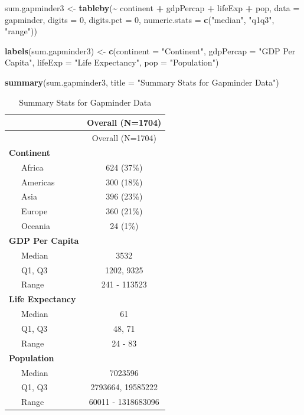 \documentclass[
]{book}
\makeatletter
\newenvironment{Shaded}{\begin{snugshade}}{\end{snugshade}}
\newcommand{\AttributeTok}[1]{\textcolor[rgb]{0.27,0.27,0.27}{#1}}
\newcommand{\DecValTok}[1]{\textcolor[rgb]{0.06,0.06,0.06}{#1}}
\newcommand{\FunctionTok}[1]{\textcolor[rgb]{0.27,0.27,0.27}{\textbf{#1}}}
\newcommand{\NormalTok}[1]{#1}
\newcommand{\OtherTok}[1]{\textcolor[rgb]{0.37,0.37,0.37}{#1}}
\newcommand{\SpecialCharTok}[1]{\textcolor[rgb]{0.43,0.43,0.43}{\textbf{#1}}}
\newcommand{\StringTok}[1]{\textcolor[rgb]{0.5,0.5,0.5}{#1}}
\newenvironment{kframe}{%
\medskip{}
\setlength{\fboxsep}{.8em}
 \def\at@end@of@kframe{}%
 \ifinner\ifhmode%
  \def\at@end@of@kframe{\end{minipage}}%
  \begin{minipage}{\columnwidth}%
 \fi\fi%
 \def\FrameCommand##1{\hskip\@totalleftmargin \hskip-\fboxsep
 \colorbox{shadecolor}{##1}\hskip-\fboxsep
     \hskip-\linewidth \hskip-\@totalleftmargin \hskip\columnwidth}%
 \MakeFramed {\advance\hsize-\width
   \@totalleftmargin\z@ \linewidth\hsize
   \@setminipage}}%
 {\par\unskip\endMakeFramed%
 \at@end@of@kframe}
\renewenvironment{Shaded}{\begin{kframe}}{\end{kframe}}
\makeatother
\begin{document}
\begin{Shaded}
\begin{Highlighting}[]
\NormalTok{sum.gapminder3 }\OtherTok{\textless{}{-}} \FunctionTok{tableby}\NormalTok{(}\SpecialCharTok{\textasciitilde{}}\NormalTok{ continent }\SpecialCharTok{+}\NormalTok{ gdpPercap }\SpecialCharTok{+}\NormalTok{ lifeExp }\SpecialCharTok{+}\NormalTok{ pop, }\AttributeTok{data =}\NormalTok{ gapminder, }\AttributeTok{digits =} \DecValTok{0}\NormalTok{, }\AttributeTok{digits.pct =} \DecValTok{0}\NormalTok{, }\AttributeTok{numeric.stats =} \FunctionTok{c}\NormalTok{(}\StringTok{"median"}\NormalTok{, }\StringTok{"q1q3"}\NormalTok{, }\StringTok{"range"}\NormalTok{))}

\FunctionTok{labels}\NormalTok{(sum.gapminder3) }\OtherTok{\textless{}{-}} \FunctionTok{c}\NormalTok{(}\AttributeTok{continent =} \StringTok{"Continent"}\NormalTok{, }\AttributeTok{gdpPercap =} \StringTok{"GDP Per Capita"}\NormalTok{, }\AttributeTok{lifeExp =} \StringTok{"Life Expectancy"}\NormalTok{, }\AttributeTok{pop =} \StringTok{"Population"}\NormalTok{)}
\end{Highlighting}
\end{Shaded}

\begin{Shaded}
\begin{Highlighting}[]
\FunctionTok{summary}\NormalTok{(sum.gapminder3, }\AttributeTok{title =} \StringTok{"Summary Stats for Gapminder Data"}\NormalTok{)}
\end{Highlighting}
\end{Shaded}

\begin{longtable}[]{@{}lc@{}}
\caption{\label{tab:unnamed-chunk-122}Summary Stats for Gapminder Data}\tabularnewline
\toprule\noalign{}
& Overall (N=1704) \\
\midrule\noalign{}
\endfirsthead
\toprule\noalign{}
& Overall (N=1704) \\
\midrule\noalign{}
\endhead
\bottomrule\noalign{}
\endlastfoot
\textbf{Continent} & \\
~~~Africa & 624 (37\%) \\
~~~Americas & 300 (18\%) \\
~~~Asia & 396 (23\%) \\
~~~Europe & 360 (21\%) \\
~~~Oceania & 24 (1\%) \\
\textbf{GDP Per Capita} & \\
~~~Median & 3532 \\
~~~Q1, Q3 & 1202, 9325 \\
~~~Range & 241 - 113523 \\
\textbf{Life Expectancy} & \\
~~~Median & 61 \\
~~~Q1, Q3 & 48, 71 \\
~~~Range & 24 - 83 \\
\textbf{Population} & \\
~~~Median & 7023596 \\
~~~Q1, Q3 & 2793664, 19585222 \\
~~~Range & 60011 - 1318683096 \\
\end{longtable}
\end{document}
